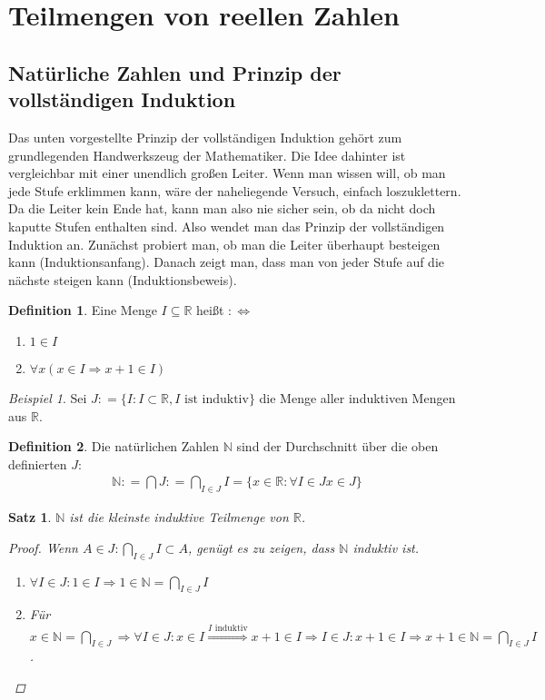\documentclass[ngerman,titlepage,twoside, parskip=half*]{scrreprt}
\newcommand*{\N}{\mathbb{N}}
\newcommand*{\R}{\mathbb{R}}
\newcommand*{\perdef}{:\Leftrightarrow}
\theoremstyle{plain}
\newtheorem{theorem}{Satz}[section]
\theoremstyle{definition}
\newtheorem{definition}{Definition}
\theoremstyle{remark}
\newtheorem*{beispiel}{Beispiel}
\newcommand*{\highl}[2][]{\textbf{\boldmath{#2}}%
  \ifthenelse{\equal{#1}{}}{\index{#2}}{\index{#1}}%
}
\newcommand*{\coloneqq}{\mathrel{\mathop:}=}
\begin{document}
\section{Teilmengen von reellen Zahlen}
\subsection{Natürliche Zahlen und Prinzip der vollständigen Induktion}
Das unten vorgestellte Prinzip der vollständigen Induktion gehört zum
grundlegenden Handwerkszeug der Mathematiker. Die Idee dahinter ist
vergleichbar mit einer unendlich großen Leiter. Wenn man wissen will, ob man
jede Stufe erklimmen kann, wäre der naheliegende Versuch, einfach
loszuklettern. Da die Leiter kein Ende hat, kann man also nie sicher sein, ob
da nicht doch kaputte Stufen enthalten sind. Also wendet man das Prinzip der
vollständigen Induktion an. Zunächst probiert man, ob man die Leiter überhaupt
besteigen kann (Induktionsanfang). Danach zeigt man, dass man von jeder Stufe
auf die nächste steigen kann (Induktionsbeweis).

\begin{definition}
  Eine Menge $I \subseteq \R$ heißt \highl{induktiv}$\perdef$
  \begin{enumerate}
  \item $1 \in I$
  \item $\forall x (x \in I \Rightarrow x+1 \in I)$
  \end{enumerate}
\end{definition}

\begin{beispiel}
  Sei $J\coloneqq\{I\colon I \subset \R, I \text{ ist induktiv}\}$ die
  Menge aller induktiven Mengen aus $\R$.
\end{beispiel}

\begin{definition}
  Die natürlichen Zahlen $\N$ sind der Durchschnitt über die oben definierten
  $J$:
  \begin{gather*}\N \coloneqq \bigcap J \coloneqq \bigcap_{I \in J} I = \{x \in \R \colon
  \forall I \in J x \in J\}\end{gather*}
\end{definition}

\begin{theorem}
  $\N$ ist die kleinste induktive Teilmenge von $\R$.
\begin{proof}
Wenn $A \in J \colon \bigcap_{I \in J} I \subset A$, genügt es zu zeigen,
dass $\N$  induktiv ist.
\begin{enumerate}
\item $\forall I \in J \colon 1 \in I \Rightarrow 1 \in \N = \bigcap_{I \in
    J} I$
\item Für $x \in \N = \bigcap_{I \in J} \Rightarrow \forall I \in J \colon x
  \in I \stackrel{I \text{ induktiv}}{\Longrightarrow} x+1 \in I\Rightarrow I
  \in J \colon x+1 \in I \Rightarrow x+1 \in \N = \bigcap_{I \in J} I$.
\end{enumerate}
\end{proof}
\end{theorem}
\end{document}
